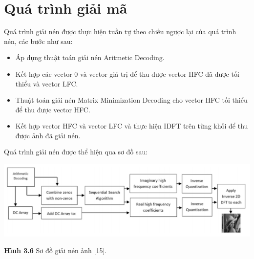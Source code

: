 \section{Quá trình giải mã}
\par Quá trình giải nén được thực hiện tuần tự theo chiều ngược lại của quá trình nén, các bước như sau:
\begin{itemize}
    \item Áp dụng thuật toán giải nén Aritmetic Decoding.
    \item Kết hợp các vector 0 và vector giá trị để thu được vector HFC đã được tối thiểu và vector LFC.
    \item Thuật toán giải nén Matrix Minimization Decoding cho vector HFC tối thiểu để thu được vector HFC.
    \item Kết hợp vector HFC và vector LFC và thực hiện IDFT trên từng khối để thu được ảnh đã giải nén.
\end{itemize}
\par Quá trình giải nén được thể hiện qua sơ đồ sau:
\begin{center}
    \includegraphics[scale=0.45]{Figures/fig23.png}
    \par \textbf {Hình 3.6} Sơ đồ giải nén ảnh [15].
\end{center}

